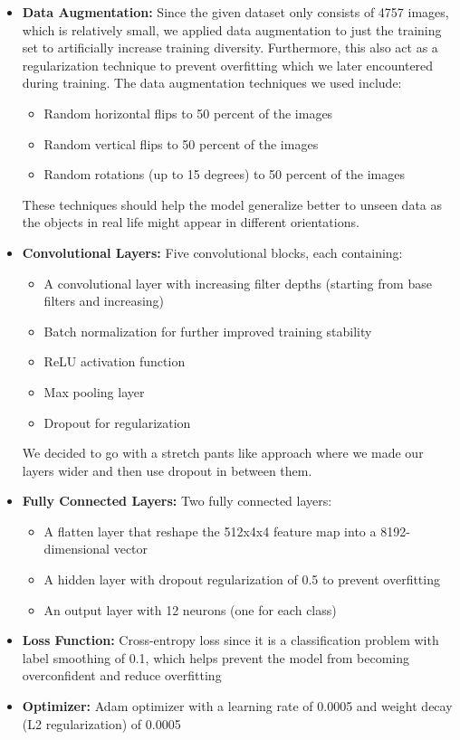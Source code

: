 \documentclass[10pt]{article}
\begin{document}
\begin{itemize}
    \item \textbf{Data Augmentation:} Since the given dataset only consists of 4757 images, which is relatively small, we applied data augmentation to just the
    training set to artificially increase training diversity. Furthermore, this also act as a regularization technique to prevent overfitting which we later
    encountered during training. The data augmentation techniques we used include:
    \begin{itemize}
        \item Random horizontal flips to 50 percent of the images
        \item Random vertical flips to 50 percent of the images
        \item Random rotations (up to 15 degrees) to 50 percent of the images
    \end{itemize}
    These techniques should help the model generalize better to unseen data as the objects in real life might appear in different orientations.

    \item \textbf{Convolutional Layers:} Five convolutional blocks, each containing:
    \begin{itemize}
        \item A convolutional layer with increasing filter depths (starting from base filters and increasing)
        \item Batch normalization for further improved training stability
        \item ReLU activation function
        \item Max pooling layer
        \item Dropout for regularization
    \end{itemize}
    We decided to go with a stretch pants like approach where we made our layers wider and then use dropout in between them.

    \item \textbf{Fully Connected Layers:} Two fully connected layers:
    \begin{itemize}
        \item A flatten layer that reshape the 512x4x4 feature map into a 8192-dimensional vector
        \item A hidden layer with dropout regularization of 0.5 to prevent overfitting
        \item An output layer with 12 neurons (one for each class)
    \end{itemize}

    \item \textbf{Loss Function:} Cross-entropy loss since it is a classification problem with label smoothing of 0.1, which helps prevent the model from becoming overconfident and reduce overfitting
    
    \item \textbf{Optimizer:} Adam optimizer with a learning rate of 0.0005 and weight decay (L2 regularization) of 0.0005
\end{itemize}
\end{document}
